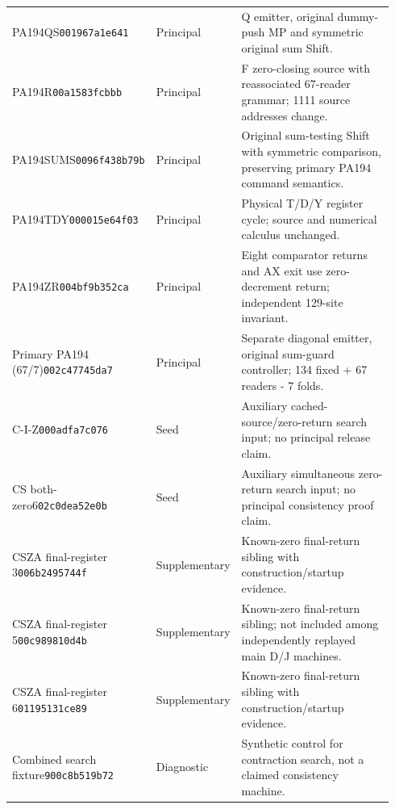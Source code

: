 {\begin{longtable}{@{}p{0.23\linewidth}p{0.13\linewidth}p{0.58\linewidth}@{}}
PA194QS\newline\texttt{001967a1e641} & Principal & Q emitter, original dummy-push MP and symmetric original sum Shift.\\[2.5pt]
PA194R\newline\texttt{00a1583fcbbb} & Principal & F zero-closing source with reassociated 67-reader grammar; 1111 source addresses change.\\[2.5pt]
PA194SUMS\newline\texttt{0096f438b79b} & Principal & Original sum-testing Shift with symmetric comparison, preserving primary PA194 command semantics.\\[2.5pt]
PA194TDY\newline\texttt{000015e64f03} & Principal & Physical T/D/Y register cycle; source and numerical calculus unchanged.\\[2.5pt]
PA194ZR\newline\texttt{004bf9b352ca} & Principal & Eight comparator returns and AX exit use zero-decrement return; independent 129-site invariant.\\[2.5pt]
Primary PA194 (67/7)\newline\texttt{002c47745da7} & Principal & Separate diagonal emitter, original sum-guard controller; 134 fixed + 67 readers - 7 folds.\\[2.5pt]
C-I-Z\newline\texttt{000adfa7c076} & Seed & Auxiliary cached-source/zero-return search input; no principal release claim.\\[2.5pt]
CS both-zero6\newline\texttt{02c0dea52e0b} & Seed & Auxiliary simultaneous zero-return search input; no principal consistency proof claim.\\[2.5pt]
CSZA final-register 3\newline\texttt{006b2495744f} & Supplementary & Known-zero final-return sibling with construction/startup evidence.\\[2.5pt]
CSZA final-register 5\newline\texttt{00c989810d4b} & Supplementary & Known-zero final-return sibling; not included among independently replayed main D/J machines.\\[2.5pt]
CSZA final-register 6\newline\texttt{01195131ce89} & Supplementary & Known-zero final-return sibling with construction/startup evidence.\\[2.5pt]
Combined search fixture\newline\texttt{900c8b519b72} & Diagnostic & Synthetic control for contraction search, not a claimed consistency machine.\\[2.5pt]

\end{longtable}}
